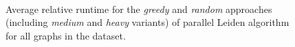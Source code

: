\begin{figure}[hbtp]
  \centering
   \\[-2ex]
  \caption{Average relative runtime for the \textit{greedy} and \textit{random} approaches (including \textit{medium} and \textit{heavy} variants) of parallel Leiden algorithm for all graphs in the dataset.}
  \label{fig:leidenopt-runtime}
\end{figure}
